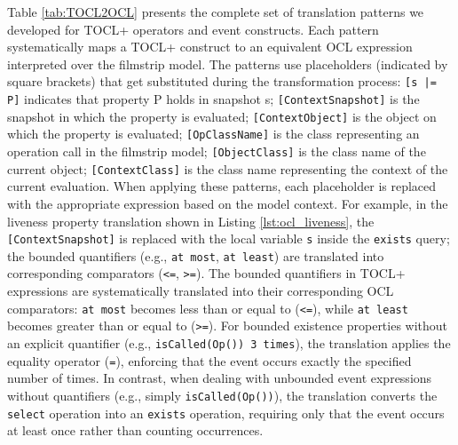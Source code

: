Table \ref{tab:TOCL2OCL} presents the complete set of translation patterns we 
developed for TOCL+ operators and event constructs. Each pattern systematically 
maps a TOCL+ construct to an equivalent OCL expression interpreted over the filmstrip 
model. The patterns use placeholders (indicated by square brackets) that get 
substituted during the transformation process: \texttt{[s |= P]} indicates that 
property P holds in snapshot s; \texttt{[ContextSnapshot]} is the snapshot in which 
the property is evaluated; \texttt{[ContextObject]} is the object on which the 
property is evaluated; \texttt{[OpClassName]} is the class representing an 
operation call in the filmstrip model; \texttt{[ObjectClass]} is the class name of 
the current object; \texttt{[ContextClass]} is the class name representing the context 
of the current evaluation. When applying these patterns, 
each placeholder is replaced with the appropriate expression based on the model 
context. For example, in the liveness property translation shown in Listing 
\ref{lst:ocl_liveness}, the \texttt{[ContextSnapshot]} is replaced with the local variable 
\texttt{s} inside the \texttt{exists} query; the bounded quantifiers (e.g., \texttt{at most}, 
\texttt{at least}) are translated into corresponding comparators (\texttt{<=}, \texttt{>=}). 
The bounded quantifiers in TOCL+ expressions are systematically translated into their 
corresponding OCL comparators: \texttt{at most} becomes less than or equal to 
(\texttt{<=}), while \texttt{at least} becomes greater than or equal to (\texttt{>=}). 
For bounded existence properties without an explicit quantifier (e.g., 
\texttt{isCalled(Op()) 3 times}), the translation applies the equality operator 
(\texttt{=}), enforcing that the event occurs exactly the specified number of times. 
In contrast, when dealing with unbounded event expressions without quantifiers (e.g., 
simply \texttt{isCalled(Op())}), the translation converts the \texttt{select} operation 
into an \texttt{exists} operation, requiring only that the event occurs at least once 
rather than counting occurrences.
    
